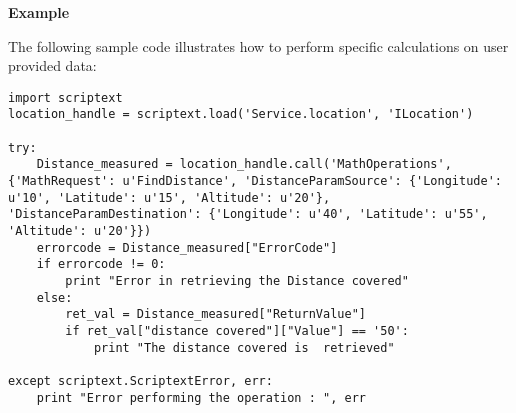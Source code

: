 {\bf Example} \break

The following sample code illustrates how to perform specific calculations on user provided data:

\begin{verbatim}
import scriptext
location_handle = scriptext.load('Service.location', 'ILocation')

try:
    Distance_measured = location_handle.call('MathOperations', {'MathRequest': u'FindDistance', 'DistanceParamSource': {'Longitude': u'10', 'Latitude': u'15', 'Altitude': u'20'}, 'DistanceParamDestination': {'Longitude': u'40', 'Latitude': u'55', 'Altitude': u'20'}})
    errorcode = Distance_measured["ErrorCode"]
    if errorcode != 0:
        print "Error in retrieving the Distance covered"
    else:
        ret_val = Distance_measured["ReturnValue"]
        if ret_val["distance covered"]["Value"] == '50':
            print "The distance covered is  retrieved"

except scriptext.ScriptextError, err:
    print "Error performing the operation : ", err
\end{verbatim}




 


























































